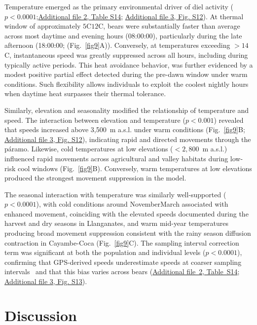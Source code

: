 \documentclass[lineno,referee,pdflatex,sn-vancouver-num]{sn-jnl}%
\theoremstyle{thmstyleone}%
\theoremstyle{thmstyletwo}%
\theoremstyle{thmstylethree}%
\begin{document}
Temperature emerged as the primary environmental driver of diel activity ($p < 0.0001$;\hyperref[S2_File]{Additional file 2, Table S14}; \hyperref[S3_File]{Additional file 3, Fig. S12}). At thermal window of approximately $5$\textdegree{}C\textendash $12$\textdegree{}C, bears were substantially faster than average across most daytime and evening hours (08:00:00), particularly during the late afternoon (18:00:00; (Fig.~\ref{fig9}A)).
Conversely, at temperatures exceeding $> 14$\textdegree{}C, instantaneous speed was greatly suppressed across all hours, including during typically active periods. This heat avoidance behavior, was further evidenced by a modest positive partial effect detected during the pre-dawn window under warm conditions. Such flexibility allows individuals to exploit the coolest nightly hours when daytime heat surpasses their thermal tolerance.

Similarly, elevation and seasonality modified the relationship of temperature and speed. The interaction between elevation and temperature ($p < 0.001$) revealed that speeds increased above 3,500~m a.s.l. under warm conditions (Fig.~\ref{fig9}B; \hyperref[S3_File]{Additional file 3, Fig. S12}), indicating rapid and directed movements through the páramo. Likewise, cold temperatures at low elevations ($< 2,800$~m a.s.l.) influenced rapid movements across agricultural and valley habitats during low-risk cool windows (Fig.~\ref{fig9}B). Conversely, warm temperatures at low elevations produced the strongest movement suppression in the model.

The seasonal interaction with temperature was similarly well-supported ($p < 0.0001$), with cold conditions around November\textendash March associated with enhanced movement, coinciding with the elevated speeds documented during the harvest and dry seasons in Llanganates, and warm mid-year temperatures producing broad movement suppression consistent with the rainy season diffusion contraction in Cayambe-Coca (Fig.~\ref{fig9}C). The sampling interval correction term was significant at both the population and individual levels ($p < 0.0001$), confirming that GPS-derived speeds underestimate speeds at coarser sampling intervals~\cite{noonanScaleinsensitiveEstimationSpeed2019} and that this bias varies across bears (\hyperref[S2_File]{Additional file~2, Table~S14}; \hyperref[S3_File]{Additional file 3, Fig. S13}).

\section{Discussion}
\end{document}
